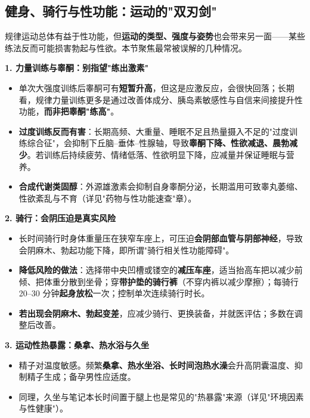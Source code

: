 \subsection{健身、骑行与性功能：运动的"双刃剑"}

规律运动总体有益于性功能，但\textbf{运动的类型、强度与姿势}也会带来另一面——某些练法反而可能损害勃起与性欲。本节聚焦最常被误解的几种情况。

\vspace{0.5em}
\noindent\textbf{1. 力量训练与睾酮：别指望"练出激素"}

\begin{itemize}
	\item 单次大强度训练后睾酮可有\textbf{短暂升高}，但这是应激反应，会很快回落；长期看，规律力量训练更多是通过改善体成分、胰岛素敏感性与自信来间接提升性功能，\textbf{而非把睾酮"练高"}。
	\item \textbf{过度训练反而有害}：长期高频、大重量、睡眠不足且热量摄入不足的"过度训练综合征"，会抑制下丘脑--垂体--性腺轴，导致\textbf{睾酮下降、性欲减退、晨勃减少}。若训练后持续疲劳、情绪低落、性欲明显下降，应减量并保证睡眠与营养。
	\item \textbf{合成代谢类固醇}：外源雄激素会抑制自身睾酮分泌，长期滥用可致睾丸萎缩、性欲紊乱与不育（详见"药物与性功能速查"章）。
\end{itemize}

\noindent\textbf{2. 骑行：会阴压迫是真实风险}

\begin{itemize}
	\item 长时间骑行时身体重量压在狭窄车座上，可压迫\textbf{会阴部血管与阴部神经}，导致会阴麻木、勃起功能下降，即所谓"骑行相关性功能障碍"。
	\item \textbf{降低风险的做法}：选择带中央凹槽或镂空的\textbf{减压车座}，适当抬高车把以减少前倾、把体重分散到坐骨；穿\textbf{带护垫的骑行裤}（不穿内裤以减少摩擦）；每骑行 20--30 分钟\textbf{起身放松}一次；控制单次连续骑行时长。
	\item \textbf{若出现会阴麻木、勃起变差}，应减少骑行、更换装备，并就医评估；多数在调整后改善。
\end{itemize}

\noindent\textbf{3. 运动性热暴露：桑拿、热水浴与久坐}

\begin{itemize}
	\item 精子对温度敏感。频繁\textbf{桑拿、热水坐浴、长时间泡热水澡}会升高阴囊温度、抑制精子生成；备孕男性应适度。
	\item 同理，久坐与笔记本长时间置于腿上也是常见的"热暴露"来源（详见"环境因素与性健康"）。
\end{itemize}

